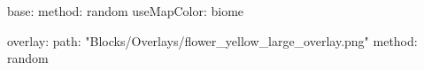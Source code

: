 base:
  method: random
  useMapColor: biome
  
overlay:
  path: "Blocks/Overlays/flower_yellow_large_overlay.png"
  method: random